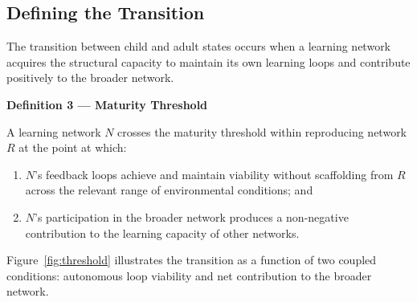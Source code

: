 \documentclass[11pt]{article}
\begin{document}
\subsection{Defining the Transition}

The transition between child and adult states occurs when a learning network acquires the
structural capacity to maintain its own learning loops and contribute positively to the
broader network.

\begin{mdframed}
\textbf{Definition 3 --- Maturity Threshold}

A learning network $N$ crosses the maturity threshold within reproducing network $R$ at the
point at which:
\begin{enumerate}
    \item $N$'s feedback loops achieve and maintain viability without scaffolding from $R$
          across the relevant range of environmental conditions; and
    \item $N$'s participation in the broader network produces a non-negative contribution to
          the learning capacity of other networks.
\end{enumerate}
\end{mdframed}

Figure~\ref{fig:threshold} illustrates the transition as a function of two coupled
conditions: autonomous loop viability and net contribution to the broader network.
\end{document}
